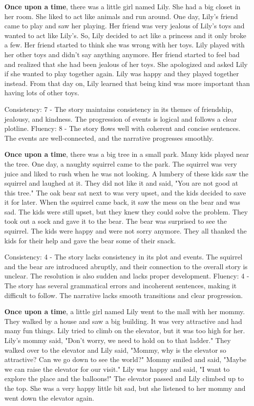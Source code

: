 \documentclass{article}
\begin{document}
\textbf{Once upon a time}, there was a little girl named Lily. She had a big closet in her room. She liked to act like animals and run around. One day, Lily's friend came to play and saw her playing. Her friend was very jealous of Lily's toys and wanted to act like Lily's. So, Lily decided to act like a princess and it only broke a few. Her friend started to think she was wrong with her toys. Lily played with her other toys and didn't say anything anymore. Her friend started to feel bad and realized that she had been jealous of her toys. She apologized and asked Lily if she wanted to play together again. Lily was happy and they played together instead. From that day on, Lily learned that being kind was more important than having lots of other toys.

Consistency: 7 - The story maintains consistency in its themes of friendship, jealousy, and kindness. The progression of events is logical and follows a clear plotline.
Fluency: 8 - The story flows well with coherent and concise sentences. The events are well-connected, and the narrative progresses smoothly.

\textbf{Once upon a time}, there was a big tree in a small park. Many kids played near the tree. One day, a naughty squirrel came to the park. The squirrel was very juice and liked to rush when he was not looking. A lumbery of these kids saw the squirrel and laughed at it. They did not like it and said, "You are not good at this tree." The oak bear sat next to was very upset, and the kids decided to save it for later. When the squirrel came back, it saw the mess on the bear and was sad. The kids were still upset, but they knew they could solve the problem. They took out a sock and gave it to the bear. The bear was surprised to see the squirrel. The kids were happy and were not sorry anymore. They all thanked the kids for their help and gave the bear some of their snack.

Consistency: 4 - The story lacks consistency in its plot and events. The squirrel and the bear are introduced abruptly, and their connection to the overall story is unclear. The resolution is also sudden and lacks proper development.
Fluency: 4 - The story has several grammatical errors and incoherent sentences, making it difficult to follow. The narrative lacks smooth transitions and clear progression.

\textbf{Once upon a time}, a little girl named Lily went to the mall with her mommy. They walked by a house and saw a big building. It was very attractive and had many fun things. Lily tried to climb on the elevator, but it was too high for her. Lily's mommy said, "Don't worry, we need to hold on to that ladder." They walked over to the elevator and Lily said, "Mommy, why is the elevator so attractive? Can we go down to see the world?" Mommy smiled and said, "Maybe we can raise the elevator for our visit." Lily was happy and said, "I want to explore the place and the balloons!" The elevator passed and Lily climbed up to the top. She was a very happy little bit sad, but she listened to her mommy and went down the elevator again.
\end{document}
